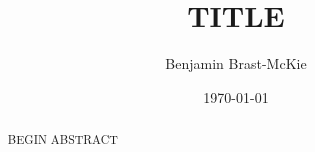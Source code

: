 \documentclass[11pt]{report} %
\begin{document}
\title{TITLE}
\author{Benjamin Brast-McKie}
\date{\today}
\maketitle
\thispagestyle{empty}

\begin{abstract}
\noindent BEGIN ABSTRACT
\end{abstract}

\setlength\cftaftertoctitleskip{10pt}
\renewcommand{\contentsname}{\LARGE\sc Table of Contents}

\strut\vspace{-50pt}
\tableofcontents
\thispagestyle{empty}

\pagebreak


\doublespacing



  













\newpage
\begin{small} %
\singlespacing %
\thispagestyle{empty} %
\end{small} %
\end{document}
